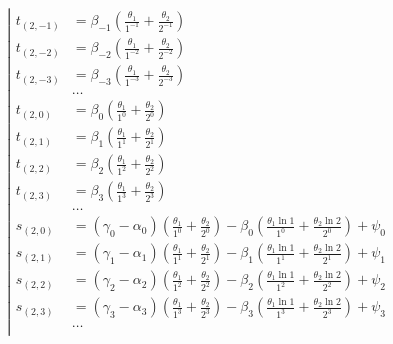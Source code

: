 \begin{equation*} \left| \begin{aligned}
t_{(2,-1)} &=
  \beta_{-1} \left(
  \frac{\theta_1}{1^{-1}}
+ \frac{\theta_2}{2^{-1}} \right) \\
%
t_{(2,-2)} &=
  \beta_{-2} \left(
  \frac{\theta_1}{1^{-2}}
+ \frac{\theta_2}{2^{-2}} \right) \\
%
t_{(2,-3)} &=
  \beta_{-3} \left(
  \frac{\theta_1}{1^{-3}}
+ \frac{\theta_2}{2^{-3}} \right) \\
%
&\ldots \\
%
t_{(2,0)} &=
  \beta_0 \left(
  \frac{\theta_1}{1^0}
+ \frac{\theta_2}{2^0} \right) \\
%
t_{(2,1)} &=
  \beta_1 \left(
  \frac{\theta_1}{1^1}
+ \frac{\theta_2}{2^1} \right) \\
%
t_{(2,2)} &=
  \beta_2 \left(
  \frac{\theta_1}{1^2}
+ \frac{\theta_2}{2^2} \right) \\
%
t_{(2,3)} &=
  \beta_3 \left(
  \frac{\theta_1}{1^3}
+ \frac{\theta_2}{2^3} \right) \\
%
&\ldots \\
%
s_{(2,0)} &=
  (\gamma_0 - \alpha_0) \left(
  \frac{\theta_1}{1^0}
+ \frac{\theta_2}{2^0} \right)
- \beta_0 \left(
  \frac{\theta_1 \ln{1}}{1^0}
+ \frac{\theta_2 \ln{2}}{2^0} \right)
+ \psi_0 \\
%
s_{(2,1)} &=
  (\gamma_1 - \alpha_1) \left(
  \frac{\theta_1}{1^1}
+ \frac{\theta_2}{2^1} \right)
- \beta_1 \left(
  \frac{\theta_1 \ln{1}}{1^1}
+ \frac{\theta_2 \ln{2}}{2^1} \right)
+ \psi_1 \\
%
s_{(2,2)} &=
  (\gamma_2 - \alpha_2) \left(
  \frac{\theta_1}{1^2}
+ \frac{\theta_2}{2^2} \right)
- \beta_2 \left(
  \frac{\theta_1 \ln{1}}{1^2}
+ \frac{\theta_2 \ln{2}}{2^2} \right)
+ \psi_2 \\
%
s_{(2,3)} &=
  (\gamma_3 - \alpha_3) \left(
  \frac{\theta_1}{1^3}
+ \frac{\theta_2}{2^3} \right)
- \beta_3 \left(
  \frac{\theta_1 \ln{1}}{1^3}
+ \frac{\theta_2 \ln{2}}{2^3} \right)
+ \psi_3 \\
%
&\ldots \\
\end{aligned} \right. \end{equation*}

